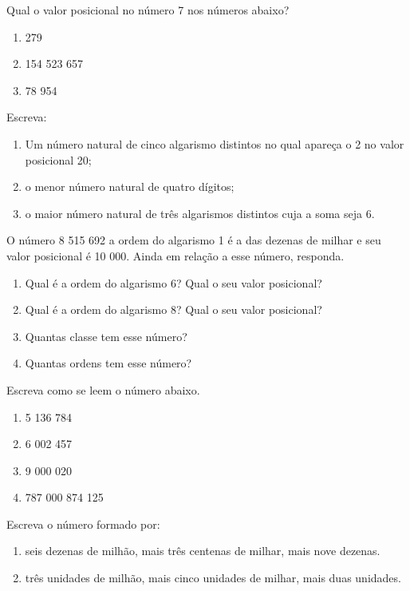 		\item Qual o valor posicional no número 7 nos números abaixo?
		\begin{multicols}{3}		
		\begin{enumerate}
			\item 279
			\item 154 523 657
			\item 78 954
		\end{enumerate}
		\end{multicols}
		
		\item Escreva:			
		\begin{enumerate}
			\item Um número natural de cinco algarismo distintos no qual apareça o 2 no valor posicional 20;
			\item o menor número natural de quatro dígitos;
			\item o maior número natural de três algarismos distintos cuja a soma seja 6.
		\end{enumerate}
		
		\item O número 8 515 692 a ordem do algarismo 1 é a das dezenas de milhar e seu valor posicional é 10 000. Ainda em relação a esse número, responda.	
		\begin{enumerate}
			\item Qual é a ordem do algarismo 6? Qual o seu valor posicional?
			\item Qual é a ordem do algarismo 8? Qual o seu valor posicional?
			\item Quantas classe tem esse número?
			\item Quantas ordens tem esse número?
		\end{enumerate}
		
		\item Escreva como se leem o número abaixo.
		\begin{multicols}{4}		
		\begin{enumerate}
			\item 5 136 784
			\item 6 002 457
			\item 9 000 020
			\item 787 000 874 125
		\end{enumerate}
		\end{multicols}
		
		\item Escreva o número formado por:
		\begin{enumerate}
				\item seis dezenas de milhão, mais três centenas de milhar, mais nove dezenas.
				\item três unidades de milhão, mais cinco unidades de milhar, mais duas unidades.
		\end{enumerate}
		
